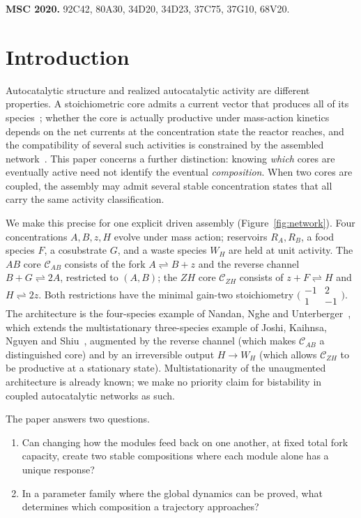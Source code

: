 \documentclass[11pt,a4paper]{article}
\theoremstyle{plain}
\theoremstyle{definition}
\theoremstyle{remark}
\newcommand{\cAB}{\mathcal{C}_{AB}}
\newcommand{\cZH}{\mathcal{C}_{ZH}}
\begin{document}
\medskip
\noindent\textbf{MSC 2020.} 92C42, 80A30, 34D20, 34D23, 37C75, 37G10, 68V20.

\section{Introduction}\label{sec:intro}

Autocatalytic structure and realized autocatalytic activity are different properties. A stoichiometric core admits a current vector that produces all of its species~\cite{blokhuis2020,unterberger2022,nandan2026}; whether the core is actually productive under mass-action kinetics depends on the net currents at the concentration state the reactor reaches, and the compatibility of several such activities is constrained by the assembled network~\cite{kosc2025}. This paper concerns a further distinction: knowing \emph{which} cores are eventually active need not identify the eventual \emph{composition}. When two cores are coupled, the assembly may admit several stable concentration states that all carry the same activity classification.

We make this precise for one explicit driven assembly (Figure~\ref{fig:network}). Four concentrations $A,B,z,H$ evolve under mass action; reservoirs $R_A,R_B$, a food species $F$, a cosubstrate $G$, and a waste species $W_H$ are held at unit activity. The $AB$ core $\cAB$ consists of the fork $A\rightleftharpoons B+z$ and the reverse channel $B+G\rightleftharpoons2A$, restricted to $(A,B)$; the $ZH$ core $\cZH$ consists of $z+F\rightleftharpoons H$ and $H\rightleftharpoons 2z$. Both restrictions have the minimal gain-two stoichiometry $\bigl(\begin{smallmatrix}-1&2\\1&-1\end{smallmatrix}\bigr)$. The architecture is the four-species example of Nandan, Nghe and Unterberger~\cite[Section~5.4]{nandan2026}, which extends the multistationary three-species example of Joshi, Kaihnsa, Nguyen and Shiu~\cite[Example~2.3]{joshi2023}, augmented by the reverse channel (which makes $\cAB$ a distinguished core) and by an irreversible output $H\to W_H$ (which allows $\cZH$ to be productive at a stationary state). Multistationarity of the unaugmented architecture is already known; we make no priority claim for bistability in coupled autocatalytic networks as such.

The paper answers two questions.

\begin{enumerate}[label=(Q\arabic*)]
\item Can changing how the modules feed back on one another, at fixed total fork capacity, create two stable compositions where each module alone has a unique response?
\item In a parameter family where the global dynamics can be proved, what determines which composition a trajectory approaches?
\end{enumerate}
\end{document}
